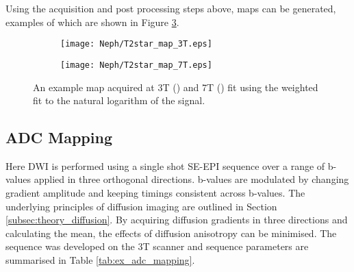 Using the acquisition and post processing steps above, \ttwostar maps can be generated, examples of which are shown in Figure \ref{fig:ex_t2star_maps}.

\begin{figure}[H]
	\centering
	\begin{subfigure}[c]{0.47\textwidth}
		\centering
		\texttt{[image: Neph/T2star\_map\_3T.eps]}
		\caption{}
		\label{fig:ex_t2star_map_3t}
	\end{subfigure}
	\hfill
	\begin{subfigure}[c]{0.47\textwidth}
		\centering
		\texttt{[image: Neph/T2star\_map\_7T.eps]}
		\caption{}
		\label{fig:ex_t2star_map_7t}
	\end{subfigure}
	\caption{An example \ttwostar map acquired at 3T () and 7T () fit using the weighted fit to the natural logarithm of the signal.}
	\label{fig:ex_t2star_maps}
\end{figure}

\subsection{\acl*{ADC} Mapping}
\label{subsec:ex_adc}

Here \ac{DWI} is performed using a single shot \ac{SE}-\ac{EPI} sequence over a range of b-values applied in three orthogonal directions. b-values are modulated by changing gradient amplitude and keeping timings consistent across b-values. The underlying principles of diffusion imaging are outlined in Section \ref{subsec:theory_diffusion}. By acquiring diffusion gradients in three directions and calculating the mean, the effects of diffusion anisotropy can be minimised. The sequence was developed on the 3T scanner and sequence parameters are summarised in Table \ref{tab:ex_adc_mapping}. 

